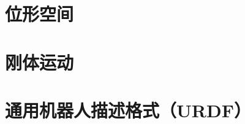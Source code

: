 \documentclass[11pt,a4paper,openany]{ctexbook}
\begin{document}
	

	\newpage

	\tableofcontents

	\chapter{位形空间}
	

	\chapter{刚体运动}
	

	\chapter{通用机器人描述格式（URDF）}
	
\end{document}
